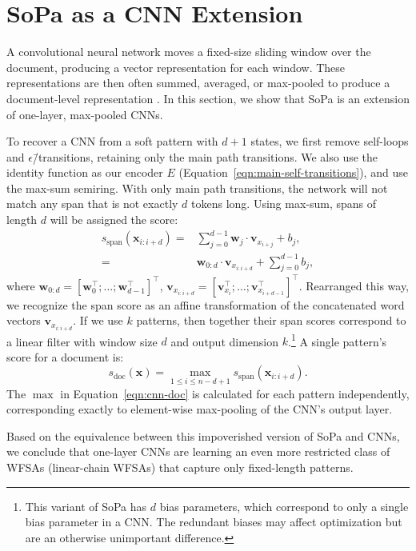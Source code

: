 \documentclass[11pt,a4paper]{article}
\newcommand{\isection}[2]{\section{#1}\label{sec:#2}}
\newcommand{\interalia}[1]{\citep{#1}} %
\newcommand{\softps}{patterns\xspace}
\newcommand{\SoftP}{SoPa\xspace}
\newcommand{\term}[1]{\textbf{#1}} %
\newcommand{\happy}{main path\xspace}
\newcommand{\epstrans}{$\epsilon$\=/transition} %
\newcommand{\relat}{an extension of\xspace}
\newcommand{\tensor}[1]{\mathbf{#1}}
\newcommand{\seq}[1]{\bm{#1}}
\begin{document}
\isection{\SoftP as a CNN Extension}{CNN}
A convolutional neural network \citep[\term{CNN};][]{lecun_gradient-based_1998} moves a fixed-size sliding window over the document, producing a vector representation for each window.
These representations are then often summed, averaged, or max-pooled to produce a document-level representation \interalia{kim_convolutional_2014,yin_multichannel_2015}.
In this section, we show that \SoftP is \relat one-layer, max-pooled CNNs.

To recover a CNN from a soft pattern with $d+1$ states, we first remove
self-loops and \epstrans s, retaining only the \happy transitions.
We also use the identity function as our encoder $E$
(Equation~\ref{eqn:main-self-transitions}), and use the max-sum semiring.
With only main path transitions, the network will 
not match any span that is not exactly $d$ tokens long.
Using max-sum, spans of length $d$ will be assigned the score:
\begin{subequations}
\begin{align}
\label{eqn:cnn-span}
  s_{\text{span}}(\seq{x}_{i:i+d})
    =& \sum_{j=0}^{d-1}{\tensor{w}_j \cdot \tensor{v}_{x_{i+j}} + b_j}, \\
    =& \tensor{w}_{0:d} \cdot \tensor{v}_{x_{i:i+d}}
      + \sum_{j=0}^{d-1}{b_j},
\end{align}
\end{subequations}
where $\tensor{w}_{0:d} = [ \tensor{w}_0^\top; \ldots ; \tensor{w}_{d-1}^\top ]^\top$,  $\tensor{v}_{x_{i:i+d}} = [ \tensor{v}_{x_i}^\top; \ldots; \tensor{v}_{x_{i+d-1}}^\top ]^\top$.
Rearranged this way, we recognize the span score as an affine transformation
of the concatenated word vectors $\tensor{v}_{x_{i:i+d}}$.
If we use $k$ patterns, then together their span scores correspond to a linear
filter with window size $d$ and output dimension $k$.\footnote{This variant of \SoftP has $d$ bias parameters, which correspond to only a single bias parameter in a CNN.
The redundant biases may affect optimization but are an otherwise unimportant difference.}
A single pattern's score for a document is:
\begin{equation}
\label{eqn:cnn-doc}
  s_\text{doc}(\seq{x}) = \max_{1 \leq i \leq n-d+1}{s_\text{span}(\seq{x}_{i:i+d})}.
\end{equation}
The $\max{}$ in Equation~\ref{eqn:cnn-doc} is calculated for each pattern independently, corresponding exactly to element-wise max-pooling of the CNN's output layer.

Based on the equivalence between this impoverished version of \SoftP and CNNs,
we conclude that one-layer CNNs are learning an even more restricted class of
WFSAs (linear-chain WFSAs) that capture only fixed-length \softps.
\end{document}
